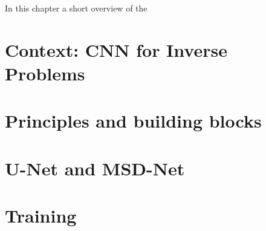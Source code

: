 In this chapter a short overview of the 

\section{Context: CNN for Inverse Problems}
\section{Principles and building blocks}\label{chp:cnn}
\section{U-Net and MSD-Net}
\section{Training}
